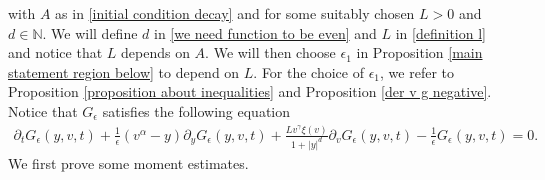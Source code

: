 \documentclass[11pt]{article}
\numberwithin{equation}{section}
\begin{document}
with $A$ as in \eqref{initial condition decay} and for some suitably chosen $L>0$ and $d\in\mathbb{N}$. We will define $d$ in \eqref{we need function to be even} and $L$ in \eqref{definition l} and notice that $L$ depends on $A$. We will then choose $\epsilon_{1}$ in Proposition \ref{main statement region below} to depend on $L$. For the choice of $\epsilon_{1}$, we refer to Proposition \ref{proposition about inequalities} and Proposition \ref{der v g negative}. Notice that $G_{\epsilon}$ satisfies the following equation
\begin{align}\label{equation supersolution}
      \partial_{t}G_{\epsilon}(y,v,t)+\frac{1}{\epsilon}(v^{\alpha}-y)\partial_{y}G_{\epsilon}(y,v,t)+\frac{Lv^{\gamma}\xi(v)}{1+|y|^{d}}\partial_{v}G_{\epsilon}(y,v,t)-\frac{1}{\epsilon}G_{\epsilon}(y,v,t)=0.
\end{align}
We first prove some moment estimates.
\end{document}
